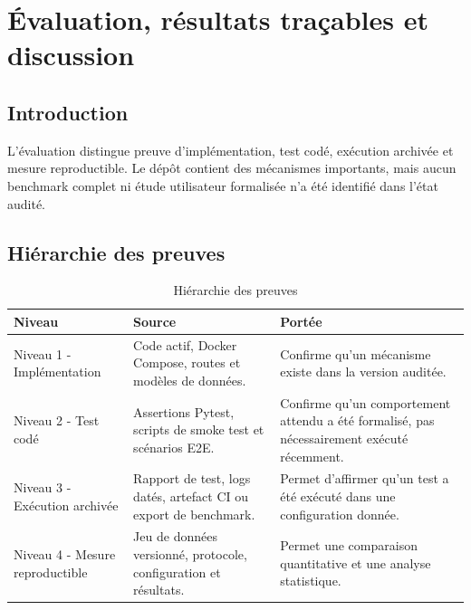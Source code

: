 
\chapter{Évaluation, résultats traçables et discussion}
\label{chap:evaluation_discussion}

\section{Introduction}
L'évaluation distingue preuve d'implémentation, test codé, exécution archivée et mesure reproductible. Le dépôt contient des mécanismes importants, mais aucun benchmark complet ni étude utilisateur formalisée n'a été identifié dans l'état audité.

\section{Hiérarchie des preuves}
\begin{table}[H]
\centering
\caption{Hiérarchie des preuves}
\label{tab:evidence_ch7}
\begin{tabular}{p{3.0cm}p{4.6cm}p{5.7cm}}
\toprule
\textbf{Niveau} & \textbf{Source} & \textbf{Portée} \\
\midrule
Niveau 1 - Implémentation & Code actif, Docker Compose, routes et modèles de données. & Confirme qu’un mécanisme existe dans la version auditée. \\
Niveau 2 - Test codé & Assertions Pytest, scripts de smoke test et scénarios E2E. & Confirme qu’un comportement attendu a été formalisé, pas nécessairement exécuté récemment. \\
Niveau 3 - Exécution archivée & Rapport de test, logs datés, artefact CI ou export de benchmark. & Permet d’affirmer qu’un test a été exécuté dans une configuration donnée. \\
Niveau 4 - Mesure reproductible & Jeu de données versionné, protocole, configuration et résultats. & Permet une comparaison quantitative et une analyse statistique. \\
\bottomrule
\end{tabular}
\end{table}
